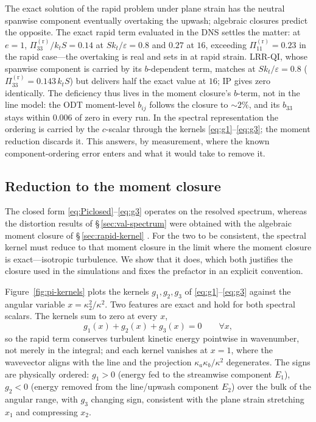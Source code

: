 \documentclass[11pt,a4paper]{article}
\begin{document}
The exact solution of the rapid problem under plane strain has the neutral
spanwise component eventually overtaking the upwash; algebraic closures
predict the opposite. The exact rapid term evaluated in the DNS settles the
matter: at $e=1$, $\Pi^{(\mathrm r)}_{33}/k_tS = 0.14$ at
$Sk_t/\varepsilon=0.8$ and $0.27$ at $16$, exceeding
$\Pi^{(\mathrm r)}_{11}=0.23$ in the rapid case---the overtaking is real
and sets in at rapid strain. LRR-QI, whose spanwise component is carried by
its $b$-dependent term, matches at $Sk_t/\varepsilon=0.8$
($\Pi^{(\mathrm r)}_{33}=0.143\,k_tS$) but delivers half the exact value at
$16$; IP gives zero identically. The deficiency thus lives in the moment
closure's $b$-term, not in the line model: the ODT moment-level $b_{ij}$
follows the closure to $\sim2\%$, and its $b_{33}$ stays within $0.006$ of
zero in every run. In the spectral representation the ordering is carried
by the $c$-scalar through the kernels
\eqref{eq:g1}--\eqref{eq:g3}; the moment reduction discards it. This
answers, by measurement, where the known component-ordering error enters
and what it would take to remove it.

\subsection{Reduction to the moment closure}\label{sec:lrr-reduction}

The closed form \eqref{eq:Piclosed}--\eqref{eq:g3} operates on the resolved
spectrum, whereas the distortion results of \S\,\ref{sec:val-spectrum} were
obtained with the algebraic moment closure of \S\,\ref{sec:rapid-kernel}
\citep{LaunderReeceRodi1975}. For the two to be consistent, the spectral
kernel must reduce to that moment closure in the limit where the moment
closure is exact---isotropic turbulence. We show that it does, which both
justifies the closure used in the simulations and fixes the prefactor in an
explicit convention.

Figure~\ref{fig:pi-kernels} plots the kernels $g_1,g_2,g_3$ of
\eqref{eq:g1}--\eqref{eq:g3} against the angular variable
$x=\kappa_2^2/\kappa^2$. Two features are exact and hold for both spectral
scalars. The kernels sum to zero at every $x$,
\begin{equation}
  g_1(x)+g_2(x)+g_3(x)=0 \qquad \forall x,
  \label{eq:gtrace}
\end{equation}
so the rapid term conserves turbulent kinetic energy pointwise in wavenumber,
not merely in the integral; and each kernel vanishes at $x=1$, where the
wavevector aligns with the line and the projection $\kappa_a\kappa_b/\kappa^2$
degenerates. The signs are physically ordered: $g_1>0$ (energy fed to the
streamwise component $E_1$), $g_2<0$ (energy removed from the line/upwash
component $E_2$) over the bulk of the angular range, with $g_3$ changing sign,
consistent with the plane strain stretching $x_1$ and compressing $x_2$.
\end{document}
